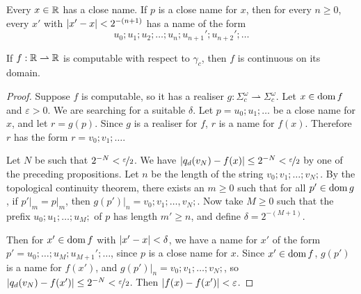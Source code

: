 \begin{lemma}
  Every $x \in \mathbb{R}$ has a close name.
  If $p$ is a close name for $x$, then for every $n \ge 0$, every $x'$ with
  $\left| x'-x \right| < 2^{-(n+1)}$ has a name of the form
  \[
	u_0; u_1; u_2; \ldots; u_n; u_{n+1}'; u_{n+2}'; \ldots
  \]
\end{lemma}

\begin{theorem}
  If $f: \mathbb{R} \rightharpoonup \mathbb{R}$ is computable with respect to $\gamma_c$, then
  $f$ is continuous on its domain.
\end{theorem}

\begin{proof}
  Suppose $f$ is computable, so it has a realiser $g: \Sigma_c^\omega
  \rightharpoonup \Sigma_c^\omega$.
  Let $x \in \operatorname{dom} f$ and $\varepsilon > 0$.
  We are searching for a suitable $\delta$.
  Let $p = u_0; u_1; \ldots$ be a close name for $x$, and let $r = g(p)$.
  Since $g$ is a realiser for $f$, $r$ is a name for $f(x)$.
  Therefore $r$ has the form $r = v_0; v_1; \ldots$.

  Let $N$ be such that $2^{-N} < \nicefrac{\varepsilon}{2}$.
  We have $\left| q_d(v_N) - f(x) \right| \le 2^{-N} < \nicefrac{\varepsilon}{2}$ by one
  of the preceding propositions.
  Let $n$ be the length of the string $v_0; v_1; \ldots; v_N;$.
  By the topological continuity theorem, there exists an $m \ge 0$ such that for
  all $p' \in \operatorname{dom} g$, if $\left. p' \right|_m = \left. p \right|_m$, then
  $\left. g(p') \right|_n = v_0; v_1; \ldots, v_N;$.
  Now take $M \ge 0$ such that the prefix $u_0; u_1; \ldots; u_M;$ of $p$ has
  length $m' \ge n$, and define $\delta = 2^{-(M+1)}$.

  Then for $x' \in \operatorname{dom} f$ with $\left| x' - x \right| < \delta$, we have a name for $x'$
  of the form $p' = u_0; \ldots; u_M; u_{M+1}'; \ldots$, since $p$ is a close
  name for $x$.
  Since $x' \in \operatorname{dom} f$, $g(p')$ is a name for $f(x')$, and $\left. g(p')
  \right|_n = v_0; v_1; \ldots; v_N;$, so $\left| q_d(v_N) - f(x') \right| \le 2^{-N} <
  \nicefrac{\varepsilon}{2}$.
  Then $\left| f(x) - f(x') \right| < \varepsilon$.
\end{proof}


